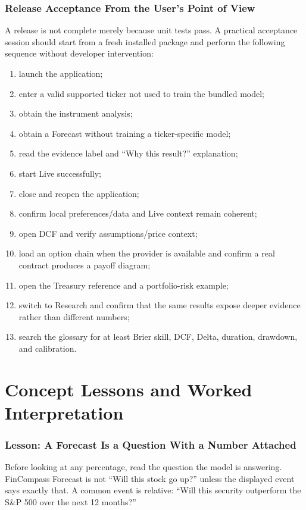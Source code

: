 \documentclass[11pt]{article}
\begin{document}
\section{Release Acceptance From the User's Point of View}
A release is not complete merely because unit tests pass. A practical acceptance session should start from a fresh installed package and perform the following sequence without developer intervention:
\begin{enumerate}[itemsep=0.25em]
\item launch the application;
\item enter a valid supported ticker not used to train the bundled model;
\item obtain the instrument analysis;
\item obtain a Forecast without training a ticker-specific model;
\item read the evidence label and ``Why this result?'' explanation;
\item start Live successfully;
\item close and reopen the application;
\item confirm local preferences/data and Live context remain coherent;
\item open DCF and verify assumptions/price context;
\item load an option chain when the provider is available and confirm a real contract produces a payoff diagram;
\item open the Treasury reference and a portfolio-risk example;
\item switch to Research and confirm that the same results expose deeper evidence rather than different numbers;
\item search the glossary for at least Brier skill, DCF, Delta, duration, drawdown, and calibration.
\end{enumerate}


\setcounter{section}{0}
\renewcommand{\thesection}{\arabic{section}}

\clearpage
\part{Concept Lessons and Worked Interpretation}

\section{Lesson: A Forecast Is a Question With a Number Attached}
Before looking at any percentage, read the question the model is answering. FinCompass Forecast is not ``Will this stock go up?'' unless the displayed event says exactly that. A common event is relative: ``Will this security outperform the S\&P 500 over the next 12 months?''
\end{document}
